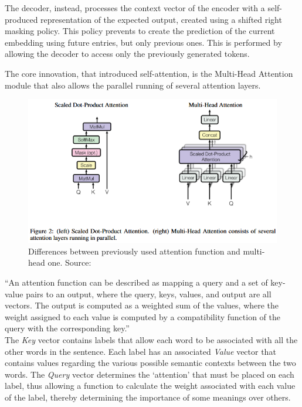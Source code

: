 \documentclass[12pt]{article}
\begin{document}
The decoder, instead, processes the context vector of the encoder with a self-produced representation of the expected output, created using a shifted right masking policy. This policy prevents to create the prediction of the current embedding using future entries, but only previous ones. This is performed by allowing the decoder to access only the previously generated tokens.

The core innovation, that introduced self-attention, is the Multi-Head Attention module that also allows the parallel running of several attention layers.
	\begin{figure}[H]
    \centering
            \includegraphics[width=1\textwidth]{attention.png}
    \caption[Multi-head attention function]{Differences between previously used attention function and multi-head one. Source: \cite{vaswani2023attentionneed}}
    \end{figure}
``An attention function can be described as mapping a query and a set of key-value pairs to an output, where the query, keys, values, and output are all vectors. The output is computed as a weighted sum of the values, where the weight assigned to each value is computed by a compatibility function of the query with the corresponding key.''\cite{vaswani2023attentionneed}\\
The \textit{Key} vector contains labels that allow each word to be associated with all the other words in the sentence. Each label has an associated \textit{Value} vector that contains values regarding the various possible semantic contexts between the two words. The \textit{Query} vector determines the ‘attention’ that must be placed on each label, thus allowing a function to calculate the weight associated with each value of the label, thereby determining the importance of some meanings over others.
\end{document}
